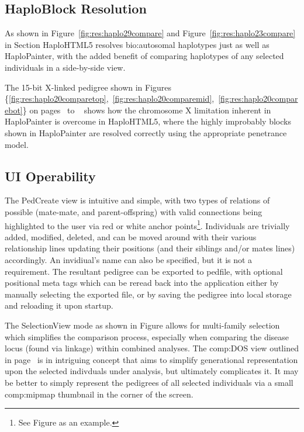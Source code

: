 \subsection{HaploBlock Resolution}
As shown in Figure~\ref{fig:res:haplo29compare} and Figure~\ref{fig:res:haplo23compare} in Section HaploHTML5 resolves \gls{bio:autosomal} haplotypes just as well as HaploPainter, with the added benefit of comparing haplotypes of any selected individuals in a side-by-side view.

The 15-bit X-linked pedigree shown in Figures \{\ref{fig:res:haplo20comparetop},~\ref{fig:res:haplo20comparemid},~\ref{fig:res:haplo20comparebot}\} on pages~\pageref*{fig:res:haplo20comparetop} to ~\pageref*{fig:res:haplo20comparebot} shows how the chromosome X limitation inherent in HaploPainter is overcome in HaploHTML5, where the highly improbably blocks shown in HaploPainter are resolved correctly using the appropriate penetrance model.

\subsection{UI Operability}
The PedCreate view is intuitive and simple, with two types of relations of possible (mate-mate, and parent-offspring) with valid connections being highlighted to the user via red or white anchor points\footnote{See Figure as an example.}. Individuals are trivially added, modified, deleted, and can be moved around with their various relationship lines updating their positions (and their siblings and/or mates lines) accordingly. An invidiual's name can also be specified, but it is not a requirement. The resultant pedigree can be exported to pedfile, with optional positional meta tags which can be reread back into the application either by manually selecting the exported file, or by saving the pedigree into local storage and reloading it upon startup.

The SelectionView mode as shown in Figure allows for multi-family selection which simplifies the comparison process, especially when comparing the disease locus (found via linkage) within combined analyses. The \gls{comp:DOS}\label{ref:disc:dos} view outlined in page~\pageref{ref:haplo:dos} is in intriguing concept that aims to simplify generational representation upon the selected indivduals under analysis, but ultimately complicates it. It may be better to simply represent the pedigrees of all selected individuals via a small \gls{comp:mipmap} thumbnail in the corner of the screen.

